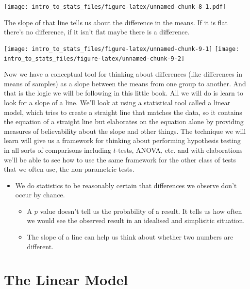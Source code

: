 \documentclass[
]{book}
\providecommand{\tightlist}{%
  \setlength{\itemsep}{0pt}\setlength{\parskip}{0pt}}
\newenvironment{roundup}
{ \begin{tcolorbox}[colbacktitle=yellow!50!white,
title=Round Up,coltitle=black,
fonttitle=\bfseries] }
{  \end{tcolorbox} }
\begin{document}
\texttt{[image: intro\_to\_stats\_files/figure-latex/unnamed-chunk-8-1.pdf]}

The slope of that line tells us about the difference in the means. If it is flat there's no difference, if it isn't flat maybe there is a difference.

\texttt{[image: intro\_to\_stats\_files/figure-latex/unnamed-chunk-9-1]} \texttt{[image: intro\_to\_stats\_files/figure-latex/unnamed-chunk-9-2]}

Now we have a conceptual tool for thinking about differences (like differences in means of samples) as a slope between the means from one group to another. And that is the logic we will be following in this little book. All we will do is learn to look for a slope of a line. We'll look at using a statistical tool called a linear model, which tries to create a straight line that matches the data, so it contains the equation of a straight line but elaborates on the equation alone by providing measures of believability about the slope and other things. The technique we will learn will give us a framework for thinking about performing hypothesis testing in all sorts of comparisons including \(t\)-tests, ANOVA, etc. and with elaborations we'll be able to see how to use the same framework for the other class of tests that we often use, the non-parametric tests.

\begin{roundup}
\begin{itemize}
\tightlist
\item
  We do statistics to be reasonably certain that differences we observe don't occur by chance.

  \begin{itemize}
  \tightlist
  \item
    A \(p\) value doesn't tell us the probability of a result. It tells us how often we would see the observed result in an idealised and simplisitic situation.
  \item
    The slope of a line can help us think about whether two numbers are different.
  \end{itemize}
\end{itemize}
\end{roundup}

\hypertarget{the-linear-model}{%
\chapter{The Linear Model}\label{the-linear-model}}
\end{document}
